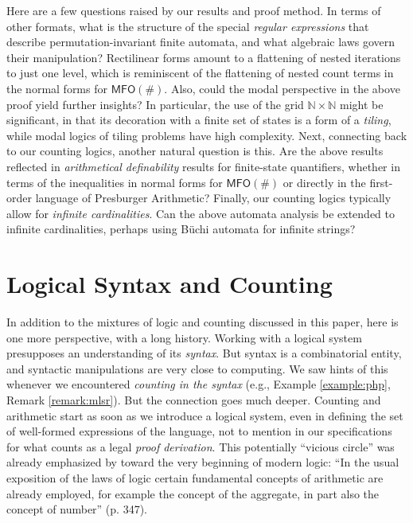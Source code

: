 \documentclass[12pt,oneside,reqno]{amsart}
\theoremstyle{definition}
\begin{document}
Here are a few questions raised by our results and proof method. In terms of other formats, what is the structure of the special \emph{regular expressions} that describe permutation-invariant finite automata, and what algebraic laws govern their manipulation? Rectilinear forms amount to a flattening of nested iterations to just one level, which is reminiscent of the flattening of nested count terms in  the normal forms for $\mathsf{MFO(\#)}$. Also, could the modal perspective in the above proof yield further insights? In particular,  the use  of the grid $\mathbb{N} \times \mathbb{N}$ might be significant, in that its decoration with a finite set of states is a form of a \emph{tiling}, while modal logics of tiling problems have high complexity.
Next, connecting back to our  counting logics, another natural question is this. Are the above results reflected in \emph{arithmetical definability} results for finite-state quantifiers, whether in terms of the inequalities in normal forms for $\mathsf{MFO(\#)}$ or directly in the first-order language of Presburger Arithmetic? Finally, our counting logics  typically allow for \emph{infinite cardinalities}. Can the above automata analysis be extended to  infinite cardinalities, perhaps using B\"{u}chi automata for infinite strings?

\section{Logical Syntax and Counting} \label{appendix:syntax}
In addition to the mixtures of logic and counting discussed in this paper, here is one more perspective, with a long history. Working with a logical system presupposes an understanding of its \emph{syntax}. But syntax is a combinatorial entity, and syntactic manipulations are very close to computing. We saw hints of this whenever we encountered \emph{counting in the syntax} (e.g.,  Example \ref{example:php}, Remark \ref{remark:mlsr}). But the connection goes much deeper.  Counting and arithmetic start as soon as we introduce a logical system, even in defining the set of well-formed expressions of the language, not to mention in our specifications for what counts as a legal \emph{proof derivation}. This potentially ``vicious circle'' was already emphasized by \cite{Hilbert} toward the very beginning of modern logic: ``In the usual exposition of the laws of logic certain fundamental concepts of arithmetic are already employed, for example the concept of the aggregate, in part also the concept of number'' (p. 347).
\end{document}
